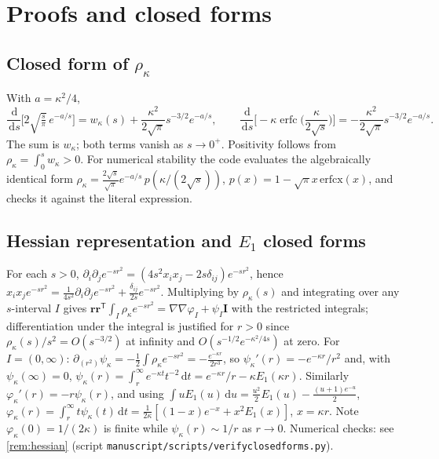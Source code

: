 \documentclass[11pt]{article}
\DeclareRobustCommand{\_}{\textunderscore\allowbreak}
\theoremstyle{remark}
\theoremstyle{definition}
\newcommand{\br}{\mathbf{r}}
\newcommand{\Id}{\mathbf{I}}
\newcommand{\dd}{\,\mathrm{d}}
\newcommand{\erfc}{\operatorname{erfc}}
\begin{document}
\appendix

\section{Proofs and closed forms}\label{app:proofs}

\subsection{Closed form of \texorpdfstring{$\rho_\kappa$}{rho\_kappa}}
With $a=\kappa^2/4$,
\[\frac{\dd}{\dd s}\Big[2\sqrt{\tfrac{s}{\pi}}\,e^{-a/s}\Big]=w_\kappa(s)+\frac{\kappa^2}{2\sqrt\pi}s^{-3/2}e^{-a/s},\qquad
\frac{\dd}{\dd s}\Big[-\kappa\erfc\Big(\frac{\kappa}{2\sqrt s}\Big)\Big]=-\frac{\kappa^2}{2\sqrt\pi}s^{-3/2}e^{-a/s}.\] The sum is $w_\kappa$; both
terms vanish as $s\to0^+$. Positivity follows from $\rho_\kappa=\int_0^sw_\kappa>0$. For numerical stability the code evaluates the
algebraically identical form $\rho_\kappa=\frac{2\sqrt s}{\sqrt\pi}e^{-a/s}\,p(\kappa/(2\sqrt s))$, $p(x)=1-\sqrt\pi x\,\mathrm{erfcx}(x)$,
and checks it against the literal expression.

\subsection{Hessian representation and \texorpdfstring{$E_1$}{E1} closed forms}\label{app:hessian}
For each $s>0$, $\partial_i\partial_je^{-sr^2}=(4s^2x_ix_j-2s\delta_{ij})e^{-sr^2}$, hence
$x_ix_je^{-sr^2}=\frac{1}{4s^2}\partial_i\partial_je^{-sr^2}+\frac{\delta_{ij}}{2s}e^{-sr^2}$. Multiplying by $\rho_\kappa(s)$ and
integrating over any $s$-interval $I$ gives $\br\br^{\mathsf T}\int_I\rho_\kappa e^{-sr^2}=\nabla\nabla\varphi_I+\psi_I\Id$ with
the restricted integrals; differentiation under the integral is justified for $r>0$ since $\rho_\kappa(s)/s^2=O(s^{-3/2})$ at infinity
and $O(s^{-1/2}e^{-\kappa^2/4s})$ at zero. For $I=(0,\infty)$:
$\partial_{(r^2)}\psi_\kappa=-\frac12\int\rho_\kappa e^{-sr^2}=-\frac{e^{-\kappa r}}{2r^3}$, so $\psi_\kappa'(r)=-e^{-\kappa r}/r^2$ and,
with $\psi_\kappa(\infty)=0$, $\psi_\kappa(r)=\int_r^\infty e^{-\kappa t}t^{-2}\dd t=e^{-\kappa r}/r-\kappa E_1(\kappa r)$. Similarly
$\varphi_\kappa'(r)=-r\psi_\kappa(r)$, and using $\int uE_1(u)\dd u=\frac{u^2}{2}E_1(u)-\frac{(u+1)e^{-u}}{2}$,
$\varphi_\kappa(r)=\int_r^\infty t\psi_\kappa(t)\dd t=\frac{1}{2\kappa}[(1-x)e^{-x}+x^2E_1(x)]$, $x=\kappa r$. Note
$\varphi_\kappa(0)=1/(2\kappa)$ is finite while $\psi_\kappa(r)\sim 1/r$ as $r\to0$. Numerical checks: see
\cref{rem:hessian} (script \texttt{manuscript/scripts/verify\_closed\_forms.py}).
\end{document}
